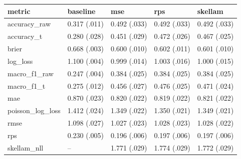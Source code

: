
\begin{tabular}{lllll}
\toprule
metric & baseline & mse & rps & skellam\\
\midrule
accuracy\_raw & 0.317 (.011) & 0.492 (.033) & 0.492 (.033) & 0.492 (.033)\\
accuracy\_t & 0.280 (.028) & 0.451 (.029) & 0.472 (.026) & 0.467 (.025)\\
brier & 0.668 (.003) & 0.600 (.010) & 0.602 (.011) & 0.601 (.010)\\
log\_loss & 1.100 (.004) & 0.999 (.014) & 1.003 (.016) & 1.000 (.015)\\
macro\_f1\_raw & 0.247 (.004) & 0.384 (.025) & 0.384 (.025) & 0.384 (.025)\\
macro\_f1\_t & 0.275 (.012) & 0.456 (.027) & 0.476 (.025) & 0.471 (.024)\\
mae & 0.870 (.023) & 0.820 (.022) & 0.819 (.022) & 0.821 (.022)\\
poisson\_log\_loss & 1.412 (.024) & 1.349 (.022) & 1.350 (.021) & 1.349 (.021)\\
rmse & 1.098 (.027) & 1.027 (.023) & 1.028 (.023) & 1.028 (.022)\\
rps & 0.230 (.005) & 0.196 (.006) & 0.197 (.006) & 0.197 (.006)\\
skellam\_nll & -- & 1.771 (.029) & 1.774 (.029) & 1.772 (.029)\\
\bottomrule
\end{tabular}
